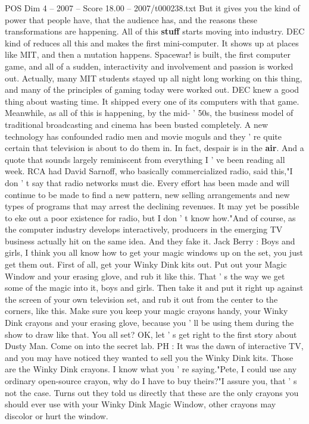 \begin{textsample}{POS Dim 4 – 2007 – Score 18.00 – 2007/t000238.txt}
But it gives you the kind of power that people have, that the audience has, and the reasons these transformations are happening.
All of this \textbf{stuff} starts moving into industry.
DEC kind of reduces all this and makes the first mini-computer.
It shows up at places like MIT, and then a mutation happens.
Spacewar! is built, the first computer game, and all of a sudden, interactivity and involvement and passion is worked out.
Actually, many MIT students stayed up all night long working on this thing, and many of the principles of gaming today were worked out.
DEC knew a good thing about wasting time.
It shipped every one of its computers with that game.
Meanwhile, as all of this is happening, by the mid- ' 50s, the business model of traditional broadcasting and cinema has been busted completely.
A new technology has confounded radio men and movie moguls and they ' re quite certain that television is about to do them in.
In fact, despair is in the \textbf{air}.
And a quote that sounds largely reminiscent from everything I ' ve been reading all week.
RCA had David Sarnoff, who basically commercialized radio, said this,"I don ' t say that radio networks must die.
Every effort has been made and will continue to be made to find a new pattern, new selling arrangements and new types of programs that may arrest the declining revenues.
It may yet be possible to eke out a poor existence for radio, but I don ' t know how."And of course, as the computer industry develops interactively, producers in the emerging TV business actually hit on the same idea.
And they fake it.
Jack Berry : Boys and girls, I think you all know how to get your magic windows up on the set, you just get them out.
First of all, get your Winky Dink kits out.
Put out your Magic Window and your erasing glove, and rub it like this.
That ' s the way we get some of the magic into it, boys and girls.
Then take it and put it right up against the screen of your own television set, and rub it out from the center to the corners, like this.
Make sure you keep your magic crayons handy, your Winky Dink crayons and your erasing glove, because you ' ll be using them during the show to draw like that.
You all set?
OK, let ' s get right to the first story about Dusty Man.
Come on into the secret lab.
PH : It was the dawn of interactive TV, and you may have noticed they wanted to sell you the Winky Dink kits.
Those are the Winky Dink crayons.
I know what you ' re saying."Pete, I could use any ordinary open-source crayon, why do I have to buy theirs?"I assure you, that ' s not the case.
Turns out they told us directly that these are the only crayons you should ever use with your Winky Dink Magic Window, other crayons may discolor or hurt the window.

\end{textsample}

